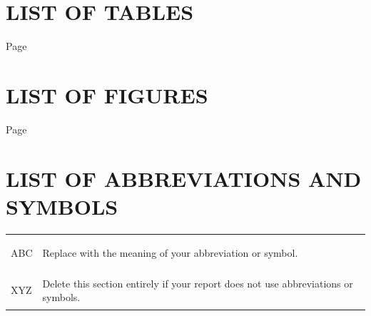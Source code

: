 
\cleardoublepage
\makeatletter
\chapter*{LIST OF TABLES}
\vspace{0pt}
\hfill{Page}\par
{}
\makeatother
\cleardoublepage

\makeatletter
\chapter*{LIST OF FIGURES}
\vspace{0pt}
\hfill{Page}\par
{}
\makeatother

\cleardoublepage
\makeatletter
\chapter*{LIST OF ABBREVIATIONS AND SYMBOLS}
\vspace{0pt}
\begin{tabular}{@{}>{\bfseries\raggedright\arraybackslash}p{3cm} >{\raggedright\arraybackslash}p{\dimexpr\textwidth-3cm-2\tabcolsep\relax}@{}}
ABC & Replace with the meaning of your abbreviation or symbol. \\
XYZ & Delete this section entirely if your report does not use abbreviations or symbols. \\
\end{tabular}
\makeatother
